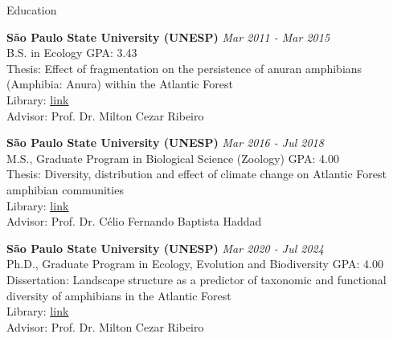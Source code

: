 \documentclass{resume}
\begin{document}

\begin{rSection}{Education}

{\bf São Paulo State University (UNESP)} \hfill {\em Mar 2011 - Mar 2015}\\
B.S. in Ecology\hfill { GPA: 3.43 }\\
Thesis: Effect of fragmentation on the persistence of anuran amphibians (Amphibia: Anura) within the Atlantic Forest\\
Library: \href{http://hdl.handle.net/11449/138991}{\underline{link}}\\
Advisor: Prof. Dr. Milton Cezar Ribeiro

{\bf São Paulo State University (UNESP)} \hfill {\em Mar 2016 - Jul 2018}\\
M.S., Graduate Program in Biological Science (Zoology)\hfill { GPA: 4.00 }\\
Thesis: Diversity, distribution and effect of climate change on Atlantic Forest amphibian communities\\
Library: \href{http://hdl.handle.net/11449/154993}{\underline{link}}\\
Advisor: Prof. Dr. Célio Fernando Baptista Haddad

{\bf São Paulo State University (UNESP)} \hfill {\em Mar 2020 - Jul 2024}\\
Ph.D., Graduate Program in Ecology, Evolution and Biodiversity \hfill { GPA: 4.00 }\\Dissertation: Landscape structure as a predictor of taxonomic and functional diversity of amphibians in the Atlantic Forest\\
Library: \href{https://hdl.handle.net/11449/256726}{\underline{link}}\\
Advisor: Prof. Dr. Milton Cezar Ribeiro

\end{rSection}

\end{document}
